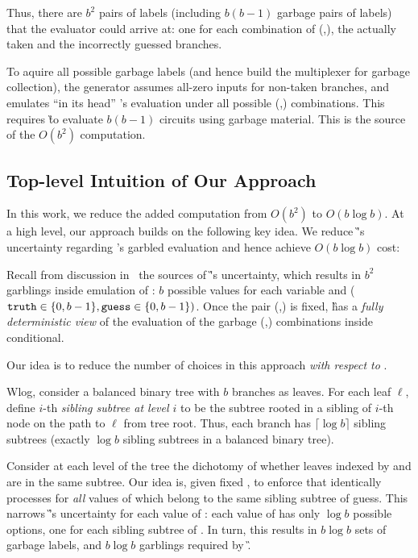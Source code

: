 Thus, there are $b^2$ pairs of labels (including  $b(b-1)$ garbage pairs of labels)  that the evaluator
could arrive at: one for each combination of (\truth,\guess), the  actually taken  and
the incorrectly guessed branches.
%


To aquire all possible garbage labels (and hence build the multiplexer for garbage collection), the \HK generator assumes all-zero inputs for non-taken branches, and emulates ``in its head'' \E's evaluation under all possible (\truth,\guess) combinations.  
This requires \G to evaluate $b(b-1)$ circuits using garbage material.
This is the source of the $O(b^2)$ computation.


\subsection{Top-level Intuition of Our Approach}

In this work, we reduce the added computation  from $O(b^2)$ to
$O(b \log b)$.
At a high level, our approach builds on the following key idea.  We reduce \G's uncertainty regarding \E's garbled evaluation and hence achieve $O(b\log b)$ cost:

\medskip
 
   Recall from discussion in~ the  sources of \G's uncertainty, which results in $b^2$ garblings inside emulation of \E: $b$ possible values for each variable \truth and \guess ($\mathtt{truth} \in\{0,b-1\}, \mathtt{guess}\in\{0,b-1\})$.
   Once the pair  (\truth,\guess) is fixed, \G has a {\em fully deterministic view} of the evaluation of the garbage (\truth,\guess)  combinations inside conditional.
   
   Our idea  is to reduce the number of \truth choices in this approach {\em with respect to  \guess}. 
  
  Wlog, consider a balanced binary tree with $b$ branches as leaves. 
  For each leaf $\ell$, define $i$-th {\em sibling subtree at level $i$} to be the subtree rooted in a sibling of $i$-th node on the path to $\ell$ from tree root.  Thus, each branch has $\lceil \log b \rceil$ sibling subtrees (exactly $\log b$ sibling subtrees in a balanced binary tree).
  
  Consider at each level of the tree the dichotomy of whether leaves indexed by \guess and \truth are in the same subtree. Our idea is, given fixed \guess, to  enforce that \E identically processes \guess for {\em all} values of \truth which belong to the same sibling subtree of guess. This narrows \G’s uncertainty for each value of \guess: each value of \guess has only $\log b$ possible \truth options, one for each sibling subtree of \guess.  In turn, this results in $b\log b$  sets of garbage labels, and $b\log b$ garblings required by \G. 
  

